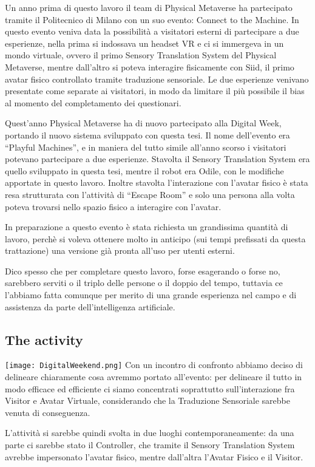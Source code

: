 \documentclass{Configuration_Files/PoliMi3i_thesis}
\begin{document}
Un anno prima di questo lavoro il team di Physical Metaverse ha partecipato tramite il Politecnico di Milano con un suo evento: Connect to the Machine. In questo evento veniva data la possibilità a visitatori esterni di partecipare a due esperienze, nella prima si indossava un headset VR e ci si immergeva in un mondo virtuale, ovvero il primo Sensory Translation System del Physical Metaverse, mentre dall’altro si poteva interagire fisicamente con Siid, il primo avatar fisico controllato tramite traduzione sensoriale. Le due esperienze venivano presentate come separate ai visitatori, in modo da limitare il più possibile il bias al momento del completamento dei questionari.

Quest’anno Physical Metaverse ha di nuovo partecipato alla Digital Week, portando il nuovo sistema sviluppato con questa tesi. Il nome dell’evento era “Playful Machines”, e in maniera del tutto simile all’anno scorso i visitatori potevano partecipare a due esperienze. Stavolta il Sensory Translation System era quello sviluppato in questa tesi, mentre il robot era Odile, con le modifiche apportate in questo lavoro. Inoltre stavolta l’interazione con l’avatar fisico è stata resa strutturata con l’attività di “Escape Room” e solo una persona alla volta poteva trovarsi nello spazio fisico a interagire con l’avatar.

In preparazione a questo evento è stata richiesta un grandissima quantità di lavoro, perchè si voleva ottenere molto in anticipo (sui tempi prefissati da questa trattazione) una versione già pronta all’uso per utenti esterni.

Dico spesso che per completare questo lavoro, forse esagerando o forse no, sarebbero serviti o il triplo delle persone o il doppio del tempo, tuttavia ce l’abbiamo fatta comunque per merito di una grande esperienza nel campo e di assistenza da parte dell’intelligenza artificiale.

\subsection{The activity}
\texttt{[image: DigitalWeekend.png]}
Con un incontro di confronto abbiamo deciso di delineare chiaramente cosa avremmo portato all’evento: per delineare il tutto in modo efficace ed efficiente ci siamo concentrati soprattutto sull’interazione fra Visitor e Avatar Virtuale, considerando che la Traduzione Sensoriale sarebbe venuta di conseguenza.

L’attività si sarebbe quindi svolta in due luoghi contemporaneamente: da una parte ci sarebbe stato il Controller, che tramite il Sensory Translation System avrebbe impersonato l’avatar fisico, mentre dall’altra l’Avatar Fisico e il Visitor.
\end{document}
